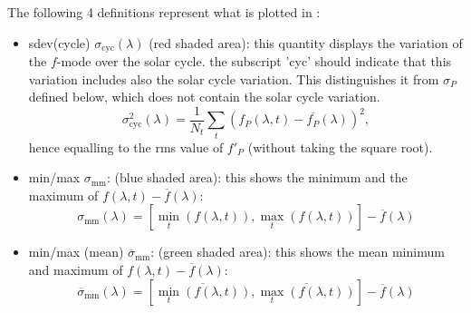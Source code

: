 \documentclass{aa}
\begin{document}
The following 4 definitions represent what is plotted in :
\begin{itemize}
\item sdev(cycle) 
$\sigma_{\mbox{cyc}}(\lambda)$ 
(red shaded area): this quantity displays the variation of the $f$-mode over the solar cycle.
the subscript 'cyc' should indicate that this variation includes also the solar cycle variation. This distinguishes it from $\sigma_P$ defined below, which does not contain the solar cycle variation.
\begin{equation}
\sigma^2_{\mbox{cyc}}(\lambda) =
\frac{1}{N_t} \sum_{t} \left( f_P(\lambda,t) -\overline{f_P}(\lambda)\right)^2,
\end{equation}
hence equalling to the rms value of $f'_P$ (without taking the square root). 

\item min/max $\sigma_{\mbox{mm}}$: (blue shaded area): this shows the minimum and the maximum  of $f(\lambda,t) - \overline{f}(\lambda)$:
\begin{equation}
\sigma_{\mbox{mm}}(\lambda) = [ \min_t (f(\lambda,t)),  \max_t (f(\lambda,t)) ] -\overline{f}(\lambda)
\end{equation}

\item min/max (mean) $\overline{\sigma}_{\mbox{mm}}$: (green shaded area): this shows the mean minimum and maximum  of $f(\lambda,t) - \overline{f}(\lambda)$:
\begin{equation}
\overline{\sigma}_{\mbox{mm}}(\lambda) = [ \overline{ \min_t (f(\lambda,t)) }, \overline{ \max_t (f(\lambda,t)) }] -\overline{f}(\lambda)
\end{equation}


\end{itemize}
\end{document}
